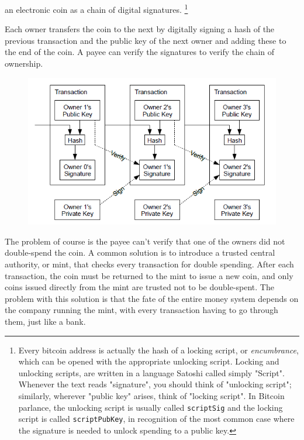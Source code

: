 \documentclass[nohyper]{tufte-handout}
\begin{document}
 an electronic coin as a chain of digital signatures.
\footnote{
Every bitcoin address is actually the hash of a locking script, or \emph{encumbrance}, which can be opened with the appropriate unlocking script.   Locking and unlocking scripts, are written in a language Satoshi called simply "Script".  Whenever the text reads "signature", you should think of "unlocking script"; similarly, wherever "public key" arises, think of "locking script".  In Bitcoin parlance, the unlocking script is usually called \texttt{scriptSig} and the locking script is called \texttt{scriptPubKey}, in recognition of the most common case where the signature is needed to unlock spending to a public key.
}


Each owner transfers the coin to the next by digitally signing a hash of the
previous transaction and the public key of the next owner and adding
these to the end of the coin. A payee can verify the signatures to
verify the chain of ownership.

\begin{figure}[!h]
\centering
\includegraphics[width=0.75\linewidth]{transactions.png}
\end{figure}

The problem of course is the payee can't verify that one of the owners did not double-spend the coin. A common solution is to introduce a trusted central authority, or mint, that checks every transaction for double spending. After each transaction, the coin must be returned to the mint to issue a new coin, and only coins issued directly from the mint are trusted not to be double-spent. The problem with this solution is that the fate of the entire money system depends on the company running the mint, with every transaction having to go through them, just like a bank.
\end{document}
